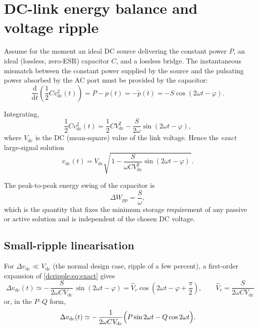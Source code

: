 \section{DC-link energy balance and voltage ripple}

Assume for the moment an ideal DC source delivering the constant power $P$, an
ideal (lossless, zero-ESR) capacitor $C$, and a lossless bridge. The
instantaneous mismatch between the constant power supplied by the source and the
pulsating power absorbed by the AC port must be provided by the capacitor:
\begin{equation}
  \frac{\mathrm d}{\mathrm d t}\left(\frac{1}{2}C v_{\mathrm{dc}}^2(t)\right)
  = P - p(t) = -\tilde p(t) = -S\cos(2\omega t - \varphi).
  \label{dcripple:eq:energy}
\end{equation}

Integrating,
\begin{equation}
  \frac{1}{2}C v_{\mathrm{dc}}^2(t)
  = \frac{1}{2}C V_{\mathrm{dc}}^2
    - \frac{S}{2\omega}\sin(2\omega t - \varphi),
  \label{dcripple:eq:w}
\end{equation}
where $V_{\mathrm{dc}}$ is the DC (mean-square) value of the link voltage. Hence
the \emph{exact} large-signal solution
\begin{equation}
  v_{\mathrm{dc}}(t)
  = V_{\mathrm{dc}}\sqrt{\,1 - \frac{S}{\omega C V_{\mathrm{dc}}^2}
    \sin(2\omega t - \varphi)\,}.
  \label{dcripple:eq:exact}
\end{equation}

The peak-to-peak energy swing of the capacitor is
\begin{equation}
  \Delta W_{\mathrm{pp}} = \frac{S}{\omega},
  \label{dcripple:eq:dW}
\end{equation}
which is the quantity that fixes the minimum storage requirement of any passive
or active solution and is independent of the chosen DC voltage.

\subsection{Small-ripple linearisation}

For $\Delta v_{\mathrm{dc}} \ll V_{\mathrm{dc}}$ (the normal design case, ripple
of a few percent), a first-order expansion of \eqref{dcripple:eq:exact} gives
\begin{equation}
  \boxed{\;
  \Delta v_{\mathrm{dc}}(t) \simeq
  -\,\frac{S}{2\omega C V_{\mathrm{dc}}}\,\sin(2\omega t - \varphi)
  = \hat V_r \cos\!\left(2\omega t - \varphi + \frac{\pi}{2}\right),
  \qquad
  \hat V_r = \frac{S}{2\omega C V_{\mathrm{dc}}} \;}
  \label{dcripple:eq:ripple}
\end{equation}
or, in the $P$--$Q$ form,
\begin{equation}
  \Delta v_{\mathrm{dc}}(t) \simeq
  -\,\frac{1}{2\omega C V_{\mathrm{dc}}}
    \Bigl(P \sin 2\omega t - Q \cos 2\omega t\Bigr).
  \label{dcripple:eq:ripplePQ}
\end{equation}

